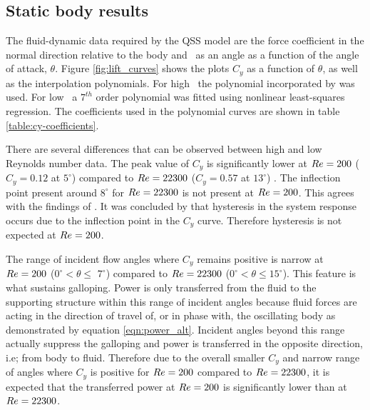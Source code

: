 \subsection{Static body results}

The fluid-dynamic data required by the QSS model are the force coefficient in the normal direction relative to the body and \cy\ as an angle as a function of the angle of attack, $\theta$. Figure \ref{fig:lift_curves} shows the plots $C_y$ as a function of $\theta$, as well as the interpolation polynomials. For high \reynoldsnumber\ the polynomial incorporated by \cite{Parkinson1964} was used. For low \reynoldsnumber\ a $7^{th}$ order polynomial was fitted using nonlinear least-squares regression. The coefficients used in the polynomial curves are shown in table \ref{table:cy-coefficients}.





There are several differences that can be observed between high and low Reynolds number data. The peak value of $C_y$ is  significantly lower at $Re=200$ ($C_y=0.12$ at $5^\circ$) compared to $Re=22300$ ($C_y=0.57$ at $13^\circ$) . The inflection point present around $8^\circ$ for $Re=22300$ is not present at $Re=200$. This agrees with the findings of \cite{Luo2003}.  It was concluded by \cite{Luo2003} that hysteresis in the system response occurs due to the inflection point in the $C_y$ curve. Therefore hysteresis is not expected at $Re=200$.

The range of incident flow angles where $C_y$ remains positive is narrow at $Re=200$ ($0^\circ <\theta \leq$ $7^\circ$) compared to $Re=22300$ ($0^\circ <\theta \leq 15^\circ$). This feature is what sustains galloping. Power is only transferred from the fluid to the supporting structure within this range of incident angles because fluid forces are acting in the direction of travel of, or in phase with, the oscillating body as demonstrated by equation \ref{eqn:power_alt}. Incident angles beyond this range actually suppress the galloping and power is transferred in the opposite direction, i.e; from body to fluid. Therefore due to the overall smaller $C_y$ and narrow range of angles where $C_y$ is positive for $Re=200$ compared to $Re=22300$, it is expected that the transferred power at $Re=200$ is significantly lower than at $Re=22300$.

